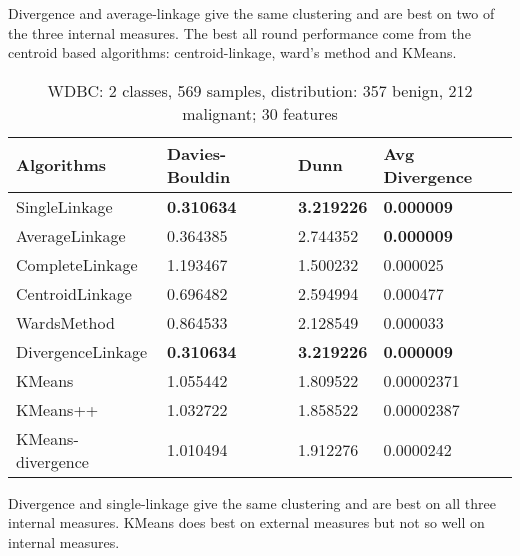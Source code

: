 Divergence and average-linkage give the same clustering and are best on two of the three internal measures.  The best all round performance come from the centroid based algorithms: centroid-linkage, ward's method and KMeans.

\begin{table}
\caption{WDBC: 2 classes, 569 samples, distribution: 
	357 benign, 
	212 malignant;
30 features}\label{tab:Wine}
\begin{tabularx}{\textwidth}{l@{\hskip 1in}XXl}
\hline
Algorithms			&Davies-Bouldin	&Dunn			&Avg Divergence\\ 
\hline
SingleLinkage			&\textbf{0.310634}	&\textbf{3.219226}     &\textbf{0.000009}\\
AverageLinkage			&0.364385			&2.744352     		&\textbf{0.000009}\\
CompleteLinkage		&1.193467			&1.500232     		&0.000025\\       
CentroidLinkage		&0.696482			&2.594994     		&0.000477\\       
WardsMethod			&0.864533			&2.128549     		&0.000033\\       
DivergenceLinkage		&\textbf{0.310634}	&\textbf{3.219226}     &\textbf{0.000009}\\       
KMeans				&1.055442			&1.809522			&0.00002371\\
KMeans++				&1.032722			&1.858522			&0.00002387\\
KMeans-divergence		&1.010494			&1.912276			&0.0000242\\
\hline
\end{tabularx}
\end{table}

Divergence and single-linkage give the same clustering and are best on all three internal measures.  KMeans does best on external measures but not so well on internal measures.


